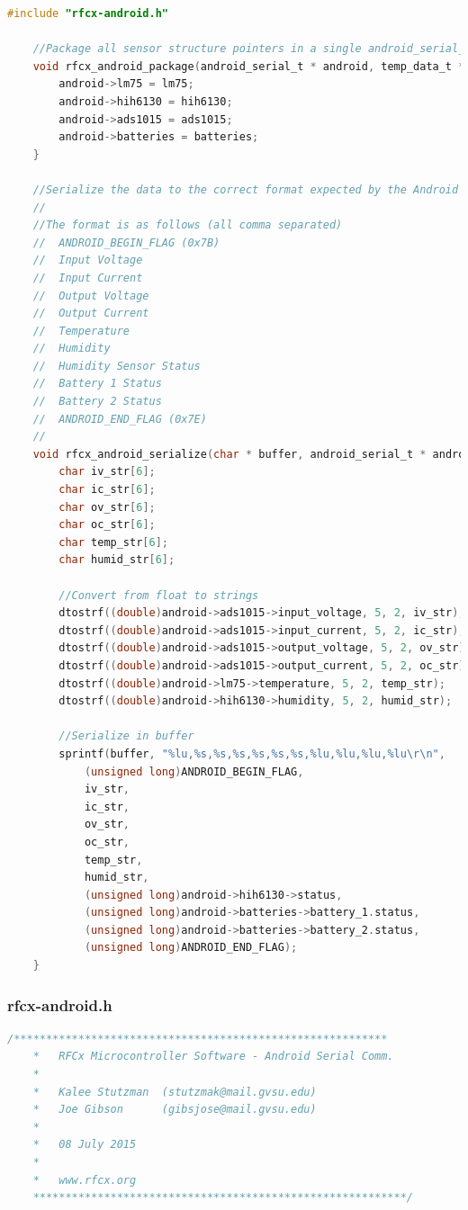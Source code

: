 \documentclass{article}
\numberwithin{figure}{section}
\numberwithin{equation}{section}
\begin{document}
{\begin{lstlisting}[language=C,label=lst:rfcx-android.c,caption=rfcx-android.c]
    #include "rfcx-android.h"

    //Package all sensor structure pointers in a single android_serial_t structure
    void rfcx_android_package(android_serial_t * android, temp_data_t * lm75, humid_data_t * hih6130, adc_data_t * ads1015, batteries_t * batteries) {
        android->lm75 = lm75;
        android->hih6130 = hih6130;
        android->ads1015 = ads1015;
        android->batteries = batteries;
    }

    //Serialize the data to the correct format expected by the Android application:
    //
    //The format is as follows (all comma separated)
    //  ANDROID_BEGIN_FLAG (0x7B)
    //  Input Voltage
    //  Input Current
    //  Output Voltage
    //  Output Current
    //  Temperature
    //  Humidity
    //  Humidity Sensor Status
    //  Battery 1 Status
    //  Battery 2 Status
    //  ANDROID_END_FLAG (0x7E)
    //
    void rfcx_android_serialize(char * buffer, android_serial_t * android) {
        char iv_str[6];
        char ic_str[6];
        char ov_str[6];
        char oc_str[6];
        char temp_str[6];
        char humid_str[6];

        //Convert from float to strings
        dtostrf((double)android->ads1015->input_voltage, 5, 2, iv_str);
        dtostrf((double)android->ads1015->input_current, 5, 2, ic_str);
        dtostrf((double)android->ads1015->output_voltage, 5, 2, ov_str);
        dtostrf((double)android->ads1015->output_current, 5, 2, oc_str);
        dtostrf((double)android->lm75->temperature, 5, 2, temp_str);
        dtostrf((double)android->hih6130->humidity, 5, 2, humid_str);

        //Serialize in buffer
        sprintf(buffer, "%lu,%s,%s,%s,%s,%s,%s,%lu,%lu,%lu,%lu\r\n",
            (unsigned long)ANDROID_BEGIN_FLAG,
            iv_str,
            ic_str,
            ov_str,
            oc_str,
            temp_str,
            humid_str,
            (unsigned long)android->hih6130->status,
            (unsigned long)android->batteries->battery_1.status,
            (unsigned long)android->batteries->battery_2.status,
            (unsigned long)ANDROID_END_FLAG);
    }
\end{lstlisting}

\subsubsection{rfcx-android.h}\label{sect:rfcx-android.h}
\begin{lstlisting}[language=C,label=lst:rfcx-android.h,caption=rfcx-android.h]
    /**********************************************************
    *	RFCx Microcontroller Software - Android Serial Comm.
    *
    *	Kalee Stutzman 	(stutzmak@mail.gvsu.edu)
    *	Joe Gibson		(gibsjose@mail.gvsu.edu)
    *
    *	08 July 2015
    *
    *   www.rfcx.org
    **********************************************************/


\end{lstlisting}}
\end{document}
